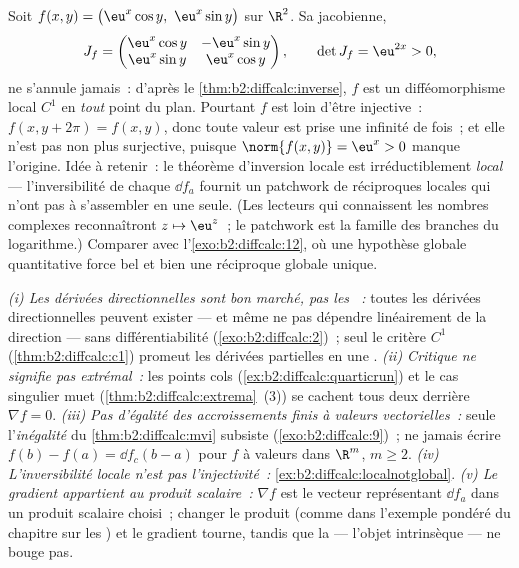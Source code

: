 \begin{example}\label{ex:b2:diffcalc:localnotglobal}
Soit $f(x, y) = \bigl(\eu^x\cos y,\ \eu^x\sin y\bigr)$ sur
$\R^2$. Sa jacobienne,
\[
J_f = \begin{pmatrix}
\eu^x\cos y & -\eu^x\sin y\\
\eu^x\sin y & \eu^x\cos y
\end{pmatrix},
\qquad
\det J_f = \eu^{2x} > 0 ,
\]
ne s'annule jamais~: d'après le \cref{thm:b2:diffcalc:inverse}, $f$
est un difféomorphisme local $C^1$ en \emph{tout} point du plan.
Pourtant $f$ est loin d'être injective~: $f(x, y + 2\pi) = f(x, y)$,
donc toute valeur est prise une infinité de fois~; et elle n'est pas
non plus surjective, puisque $\norm{f(x, y)} = \eu^x > 0$ manque
l'origine. Idée à retenir~: le théorème d'inversion locale est
irréductiblement \emph{local} --- l'inversibilité de chaque $\dd f_a$
fournit un patchwork de réciproques locales qui n'ont pas à
s'assembler en une seule. (Les lecteurs qui connaissent les nombres
complexes reconnaîtront $z \mapsto \eu^z$~; le patchwork est la
famille des branches du logarithme.) Comparer avec
l'\cref{exo:b2:diffcalc:12}, où une hypothèse globale quantitative
force bel et bien une réciproque globale unique.
\end{example}

\begin{remark}
\emph{(i) Les dérivées directionnelles sont bon marché, pas les
~:} toutes les dérivées directionnelles peuvent
exister --- et même ne pas dépendre linéairement de la direction ---
sans différentiabilité (\cref{exo:b2:diffcalc:2})~; seul le critère
$C^1$ (\cref{thm:b2:diffcalc:c1}) promeut les dérivées partielles en
une . \emph{(ii) Critique ne signifie pas extrémal~:}
les points cols (\cref{ex:b2:diffcalc:quarticrun}) et le cas
singulier muet (\cref{thm:b2:diffcalc:extrema}~(3)) se cachent tous
deux derrière $\nabla f = 0$. \emph{(iii) Pas d'égalité des
accroissements finis à valeurs vectorielles~:} seule l'\emph{inégalité}
du \cref{thm:b2:diffcalc:mvi} subsiste
(\cref{exo:b2:diffcalc:9})~; ne jamais écrire $f(b) - f(a) = \dd
f_c(b-a)$ pour $f$ à valeurs dans $\R^m$, $m \geq 2$.
\emph{(iv) L'inversibilité locale n'est pas l'injectivité~:}
\cref{ex:b2:diffcalc:localnotglobal}. \emph{(v) Le gradient
appartient au produit scalaire~:} $\nabla f$ est le vecteur
représentant $\dd f_a$ dans un produit scalaire choisi~; changer le
produit (comme dans l'exemple pondéré du chapitre sur les ) et le gradient tourne, tandis que la  ---
l'objet intrinsèque --- ne bouge pas.
\end{remark}


